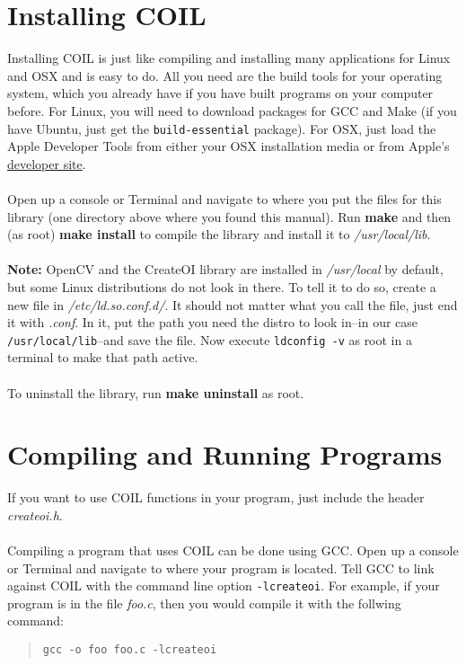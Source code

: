 \documentclass {article}
\begin{document}
\section {Installing COIL}
Installing COIL is just like compiling and installing many applications for Linux and OSX and is
easy to do.  All you need are the build tools for your operating system, which you already have if
you have built programs on your computer before.  For Linux, you will need to download packages for
GCC and Make (if you have Ubuntu, just get the {\tt build-essential} package).  For OSX, just load
the Apple Developer Tools from either your OSX installation media or from Apple's
\href{http://developer.apple.com/}{developer site}. \\
\\
Open up a console or Terminal and navigate to where you put the files for this library (one
directory above where you found this manual).  Run {\bf make} and then (as root) {\bf make install}
to compile the library and install it to {\it /usr/local/lib}. \\
\\
{\bf Note:} OpenCV and the CreateOI library are installed in {\it /usr/local} by default, but some
Linux distributions do not look in there.  To tell it to do so, create a new file in {\it
  /etc/ld.so.conf.d/}.  It should not matter what you call the file, just end it with {\it .conf}.
In it, put the path you need the distro to look in--in our case {\tt /usr/local/lib}--and save the
file.  Now execute {\tt ldconfig -v} as root in a terminal to make that path active. \\
\\
To uninstall the library, run {\bf make uninstall} as root.


\section {Compiling and Running Programs}
If you want to use COIL functions in your program, just include the header {\it createoi.h}. \\
\\
Compiling a program that uses COIL can be done using GCC.  Open up a console or Terminal and
navigate to where your program is located.  Tell GCC to link against COIL with the command line
option {\tt -lcreateoi}.  For example, if your program is in the file {\it foo.c}, then you would
compile it with the follwing command:

\begin {quote}
  {\tt gcc -o foo foo.c -lcreateoi}
\end {quote}
\end{document}
